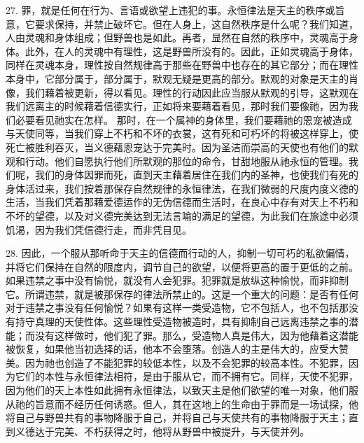 27. 罪，就是任何在行为、言语或欲望上违犯的事。永恒律法是天主的秩序或旨意，它要求保持，并禁止破坏它。但在人身上，这自然秩序是什么呢？我们知道，人由灵魂和身体组成；但野兽也是如此。再者，显然在自然的秩序中，灵魂高于身体。此外，在人的灵魂中有理性，这是野兽所没有的。因此，正如灵魂高于身体，同样在灵魂本身，理性按自然规律高于那些在野兽中也存在的其它部分；而在理性本身中，它部分属于，部分属于，默观无疑是更高的部分。默观的对象是天主的肖像，我们藉着被更新，得以看见。理性的行动因此应当服从默观的引导，这默观在我们远离主的时候藉着信德实行，正如将来要藉着看见，那时我们要像祂，因为我们必要看见祂实在怎样。 那时，在一个属神的身体里，我们要藉祂的恩宠被造成与天使同等，当我们穿上不朽和不坏的衣裳，这有死和可朽坏的将被这样穿上，使死亡被胜利吞灭，当义德藉恩宠达于完美时。因为圣洁而崇高的天使也有他们的默观和行动。他们自愿执行他们所默观的那位的命令，甘甜地服从祂永恒的管理。我们呢，我们的身体因罪而死，直到天主藉着居住在我们内的圣神，也使我们有死的身体活过来，我们按着那保存自然规律的永恒律法，在我们微弱的尺度内度义德的生活，当我们凭着那藉爱德运作的无伪信德而生活时，在良心中存有对天上不朽和不坏的望德，以及对义德完美达到无法言喻的满足的望德，为此我们在旅途中必须饥渴，因为我们凭信德行走，而非凭目见。\par

28. 因此，一个服从那听命于天主的信德而行动的人，抑制一切可朽的私欲偏情，并将它们保持在自然的限度内，调节自己的欲望，以便将更高的置于更低的之前。如果违禁之事中没有愉悦，就没有人会犯罪。犯罪就是放纵这种愉悦，而非抑制它。所谓违禁，就是被那保存的律法所禁止的。这是一个重大的问题：是否有任何对于违禁之事没有任何愉悦？如果有这样一类受造物，它不包括人，也不包括那没有持守真理的天使性体。这些理性受造物被造时，具有抑制自己远离违禁之事的潜能；而没有这样做时，他们犯了罪。那么，受造物人真是伟大，因为他藉着这潜能被恢复，如果他当初选择的话，他本不会堕落。创造人的主是伟大的，应受大赞美。因为祂也创造了不能犯罪的较低本性，以及不会犯罪的较高本性。不犯罪，因为它们的本性与永恒律法相符，是由于服从它，而不拥有它。同样，天使不犯罪，因为他们的天上本性如此拥有永恒律法，以致天主是他们欲望的唯一对象，他们服从祂的旨意而不经历任何诱惑。但人，其在这地上的生命由于罪而是一场试探，他将自己与野兽共有的事物降服于自己，并将自己与天使共有的事物降服于天主；直到义德达于完美、不朽获得之时，他将从野兽中被提升，与天使并列。\par

